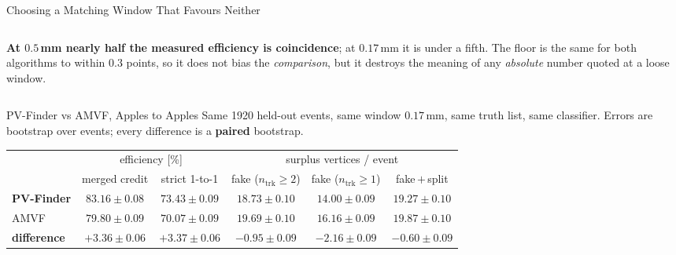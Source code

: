 \documentclass[xcolor=table,aspectratio=169]{beamer}
\newcommand{\ntrk}{\ensuremath{n_\mathrm{trk}}}
\begin{document}
\begin{frame}{Choosing a Matching Window That Favours Neither}
\begin{columns}[t]
\begin{column}{0.5\linewidth}
            \textbf{At $0.5$\,mm nearly half the measured efficiency is coincidence};
            at $0.17$\,mm it is under a fifth. The floor is the same for both
            algorithms to within $0.3$ points, so it does not bias the
            \emph{comparison}, but it destroys the meaning of any \emph{absolute}
            number quoted at a loose window.
        \end{column}
    \end{columns}
\end{frame}

\begin{frame}{PV-Finder vs AMVF, Apples to Apples}
    \vspace{-0.2em}
    \centering
    \scriptsize
    Same 1920 held-out events, same window $0.17$\,mm, same truth list, same
    classifier. Errors are bootstrap over events; every difference is a
    \textbf{paired} bootstrap.
    \vspace{0.25em}

    \setlength{\tabcolsep}{5pt}
    \begin{tabular}{lccccc}
        \toprule
        & \multicolumn{2}{c}{efficiency [\%]} & \multicolumn{3}{c}{surplus vertices / event} \\
        \cmidrule(lr){2-3}\cmidrule(lr){4-6}
        & merged credit & strict 1-to-1 & fake ($\ntrk\!\geq\!2$) & fake ($\ntrk\!\geq\!1$) & fake\,$+$\,split \\
        \midrule
        \textbf{PV-Finder} & $83.16 \pm 0.08$ & $73.43 \pm 0.09$ & $18.73 \pm 0.10$ & $14.00 \pm 0.09$ & $19.27 \pm 0.10$ \\
        AMVF               & $79.80 \pm 0.09$ & $70.07 \pm 0.09$ & $19.69 \pm 0.10$ & $16.16 \pm 0.09$ & $19.87 \pm 0.10$ \\
        \midrule
        \textbf{difference} & $\mathbf{+3.36 \pm 0.06}$ & $\mathbf{+3.37 \pm 0.06}$ & $\mathbf{-0.95 \pm 0.09}$ & $\mathbf{-2.16 \pm 0.09}$ & $\mathbf{-0.60 \pm 0.09}$ \\
        \bottomrule
    \end{tabular}
    \vspace{0.5em}


\end{frame}
\end{document}
